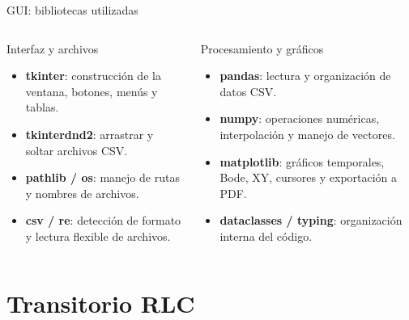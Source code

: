 \documentclass[aspectratio=169,11pt]{beamer}
\begin{document}
\begin{frame}{GUI: bibliotecas utilizadas}

\scriptsize

\begin{columns}[T,onlytextwidth]

\begin{block}{Interfaz y archivos}
\begin{itemize}
    \item \textbf{tkinter}: construcción de la ventana, botones, menús y tablas.
    \item \textbf{tkinterdnd2}: arrastrar y soltar archivos CSV.
    \item \textbf{pathlib / os}: manejo de rutas y nombres de archivos.
    \item \textbf{csv / re}: detección de formato y lectura flexible de archivos.
\end{itemize}
\end{block}

\begin{block}{Procesamiento y gráficos}
\begin{itemize}
    \item \textbf{pandas}: lectura y organización de datos CSV.
    \item \textbf{numpy}: operaciones numéricas, interpolación y manejo de vectores.
    \item \textbf{matplotlib}: gráficos temporales, Bode, XY, cursores y exportación a PDF.
    \item \textbf{dataclasses / typing}: organización interna del código.
\end{itemize}
\end{block}

\end{columns}

\vspace{0.15cm}

\end{frame}
\section{Transitorio RLC}
\end{document}

